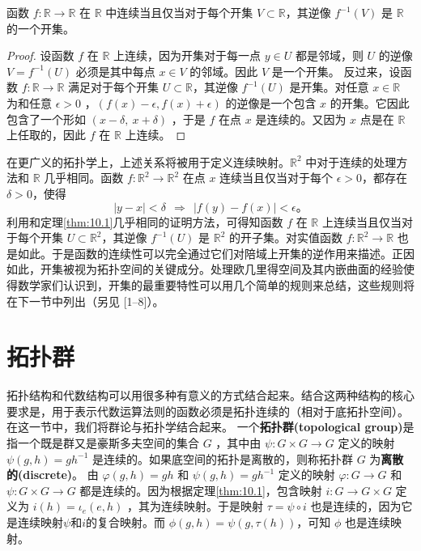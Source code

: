 \begin{theorem}\label{thm:10.1} 
     函数 $f:\mathbb{R}\rightarrow \mathbb{R}$ 在 $\mathbb{R}$ 中连续当且仅当对于每个开集 $V\subset \mathbb{R}$，其逆像 $f^{-1} (V)$ 是 $\mathbb{R}$ 的一个开集。
\end{theorem}
\begin{proof}
设函数 $ f$ 在 $ \mathbb{R}$ 上连续，因为开集对于每一点 $ y\in U$ 都是邻域，则 $ U$ 的逆像 $ V=f^{-1}( U)$ 必须是其中每点 $ x\in V$ 的邻域。因此 $ V$ 是一个开集。
    反过来，设函数 $f:\mathbb{R}\rightarrow \mathbb{R}$ 满足对于每个开集 $U\subset \mathbb{R}$，其逆像 $f^{-1} (U)$ 是开集。对任意 $x\in \mathbb{R}$ 为和任意 $\epsilon  >0$ ，$(f(x)-\epsilon ,f(x)+\epsilon )$ 的逆像是一个包含 $ x$ 的开集。它因此包含了一个形如 $ ( x-\delta ,\ x+\delta )$ ，于是 $ f$ 在点 $ x$ 是连续的。又因为 $ x$ 点是在 $\mathbb{R}$ 上任取的，因此 $ f$ 在 $\mathbb{R}$ 上连续。
\end{proof}
    在更广义的拓扑学上，上述关系将被用于定义连续映射。$\mathbb{R}^{2}$ 中对于连续的处理方法和 $ \mathbb{R}$ 几乎相同。函数 $f:\mathbb{R}^{2}\rightarrow \mathbb{R}^{2}$ 在点 $x$ 连续当且仅当对于每个 $\epsilon  >0$，都存在 $\delta  >0$，使得
\begin{equation*}
|y-x|< \delta \ \ \Rightarrow \ \ |f(y)-f(x)|< \epsilon 。
\end{equation*}
利用和定理\ref{thm:10.1}几乎相同的证明方法，可得知函数 $f$ 在 $ \mathbb{R}$ 上连续当且仅当对于每个开集 $U\subset \mathbb{R}^{2}$，其逆像 $f^{-1} (U)$ 是 $\mathbb{R}^{2}$ 的开子集。对实值函数 $f:\mathbb{R}^{2}\rightarrow \mathbb{R}$ 也是如此。于是函数的连续性可以完全通过它们对陪域上开集的逆作用来描述。正因如此，开集被视为拓扑空间的关键成分。处理欧几里得空间及其内嵌曲面的经验使得数学家们认识到，开集的最重要特性可以用几个简单的规则来总结，这些规则将在下一节中列出（另见 [1–8]）。
\section{拓扑群}
拓扑结构和代数结构可以用很多种有意义的方式结合起来。结合这两种结构的核心要求是，用于表示代数运算法则的函数必须是拓扑连续的（相对于底拓扑空间）。在这一节中，我们将群论与拓扑学结合起来。
	一个\textbf{拓扑群(topological group)}是指一个既是群又是豪斯多夫空间的集合 $ G$ ，其中由 $\psi :G\times G\rightarrow G$ 定义的映射 $\psi (g,h)=gh^{-1}$ 是连续的。如果底空间的拓扑是离散的，则称拓扑群 $G$ 为\textbf{离散的(discrete)}。
	由 $\varphi (g,h)=gh$ 和 $\psi (g,h)=gh^{-1}$ 定义的映射 $\varphi :G\rightarrow G$ 和 $\psi :G\times G\rightarrow G$ 都是连续的。因为根据定理\ref{thm:10.1}，包含映射 $i:G\rightarrow G\times G$ 定义为 $i(h)=\iota _{e} (e,h)$ ，其为连续映射。于是映射 $\tau =\psi \circ i$ 也是连续的，因为它是连续映射$ \psi $和$ i$的复合映射。而 $\phi ( g,h) =\psi (g,\tau (h))$，可知 $\phi $ 也是连续映射。


